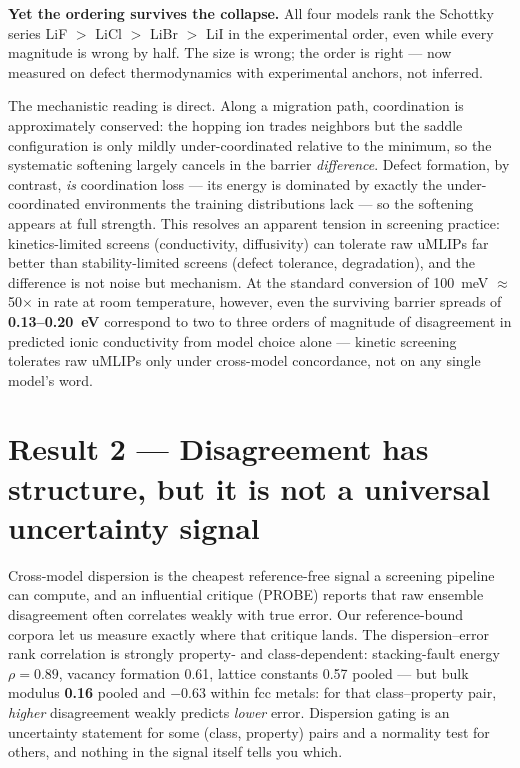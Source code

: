 \documentclass[11pt]{article}
\theoremstyle{definition}
\theoremstyle{remark}
\begin{document}
\medskip
\noindent\textbf{Yet the ordering survives the collapse.} All four models rank the Schottky series LiF $>$ LiCl $>$ LiBr $>$ LiI in the experimental order, even while every magnitude is wrong by half. The size is wrong; the order is right --- now measured on defect thermodynamics with experimental anchors, not inferred.

\medskip
The mechanistic reading is direct. Along a migration path, coordination is approximately conserved: the hopping ion trades neighbors but the saddle configuration is only mildly under-coordinated relative to the minimum, so the systematic softening largely cancels in the barrier \emph{difference}. Defect formation, by contrast, \emph{is} coordination loss --- its energy is dominated by exactly the under-coordinated environments the training distributions lack --- so the softening appears at full strength. This resolves an apparent tension in screening practice: kinetics-limited screens (conductivity, diffusivity) can tolerate raw uMLIPs far better than stability-limited screens (defect tolerance, degradation), and the difference is not noise but mechanism. At the standard conversion of 100~meV $\approx$ 50$\times$ in rate at room temperature, however, even the surviving barrier spreads of \textbf{0.13--0.20~eV} correspond to two to three orders of magnitude of disagreement in predicted ionic conductivity from model choice alone --- kinetic screening tolerates raw uMLIPs only under cross-model concordance, not on any single model's word.

\section*{Result 2 --- Disagreement has structure, but it is not a universal uncertainty signal}

Cross-model dispersion is the cheapest reference-free signal a screening pipeline can compute, and an influential critique (PROBE) reports that raw ensemble disagreement often correlates weakly with true error. Our reference-bound corpora let us measure exactly where that critique lands. The dispersion--error rank correlation is strongly property- and class-dependent: stacking-fault energy $\rho = 0.89$, vacancy formation 0.61, lattice constants 0.57 pooled --- but bulk modulus \textbf{0.16} pooled and {\boldmath$-0.63$} within fcc metals: for that class--property pair, \emph{higher} disagreement weakly predicts \emph{lower} error. Dispersion gating is an uncertainty statement for some (class, property) pairs and a normality test for others, and nothing in the signal itself tells you which.
\end{document}
